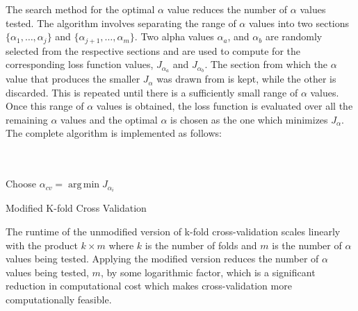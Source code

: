 \documentclass[a4paper,12pt]{article}
\DeclareMathOperator*{\argmin}{arg\,min}
\begin{document}
The search method for the optimal $\alpha$ value reduces the number of $\alpha$ values tested. The algorithm involves separating the range of $\alpha$ values into two sections $\{\alpha_{1},\ldots,\alpha_j\}$ and $\{\alpha_{j+1},\ldots, \alpha_{m}\}$. Two alpha values $\alpha_a$, and $\alpha_b$ are randomly selected from the respective sections and are used to compute for the corresponding loss function values, $J_{\alpha_{a}}$ and $J_{\alpha_{b}}$. The section from which the $\alpha$ value that produces the smaller $J_{\alpha}$ was drawn from is kept, while the other is discarded. This is repeated until there is a sufficiently small range of $\alpha$ values. Once this range of $\alpha$ values is obtained, the loss function is evaluated over all the remaining $\alpha$ values and the optimal $\alpha$ is chosen as the one which minimizes $J_{\alpha}$. The complete algorithm is implemented as follows:\\

\begin{algorithm}[H]
	\SetAlgoLined
	 \\
	\\
	Choose $\alpha_{cv} = \argmin{J_{\alpha_{i}}}$
	\caption{Modified K-fold Cross Validation}
\end{algorithm} 
\medskip

The runtime of the unmodified version of k-fold cross-validation scales linearly with the product $k \times m$ where $k$ is the number of folds and $m$ is the number of $\alpha$ values being tested. Applying the modified version reduces the number of $\alpha$ values being tested, $m$, by some logarithmic factor, which is a significant reduction in computational cost which makes cross-validation more computationally feasible.
\end{document}
